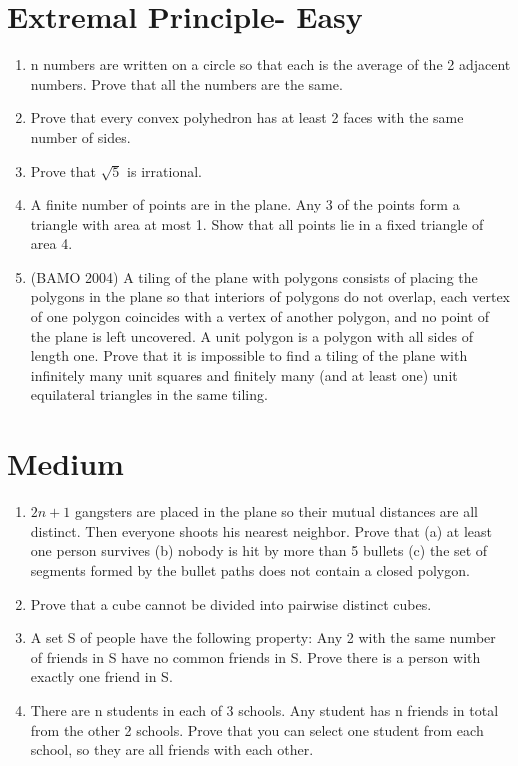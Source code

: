 \documentclass{article}
\begin{document}
\section{Extremal Principle- Easy}
\begin{enumerate}
\item n numbers are written on a circle so that each is the average of the 2 adjacent numbers. Prove that all the numbers are the same.
\item Prove that every convex polyhedron has at least 2 faces with the same number of sides.
\item Prove that $\sqrt{5}$ is irrational.
\item A finite number of points are in the plane. Any 3 of the points form a triangle with area at most 1. Show that all points lie in a fixed triangle of area 4.
\item (BAMO 2004) A tiling of the plane with polygons consists of placing the polygons in the plane so that interiors of
polygons do not overlap, each vertex of one polygon coincides with a vertex of another polygon, and no
point of the plane is left uncovered. A unit polygon is a polygon with all sides of length one. Prove that it is impossible to find a tiling of the plane with infinitely many unit squares and finitely
many (and at least one) unit equilateral triangles in the same tiling.
\end{enumerate}

\section{Medium}
\begin{enumerate}
\item $2n+1$ gangsters are placed in the plane so their mutual distances are all distinct. Then everyone shoots his nearest neighbor. Prove that (a) at least one person survives
(b) nobody is hit by more than 5 bullets
(c) the set of segments formed by the bullet paths does not contain a closed polygon.
\item Prove that a cube cannot be divided into pairwise distinct cubes.
\item A set S of people have the following property: Any 2 with the same number of friends in S have no common friends in S. Prove there is a person with exactly one friend in S.
\item There are n students in each of 3 schools. Any student has n friends in total from the other 2 schools. Prove that you can select one student from each school, so they are all friends with each other.
\end{enumerate}
\end{document}
